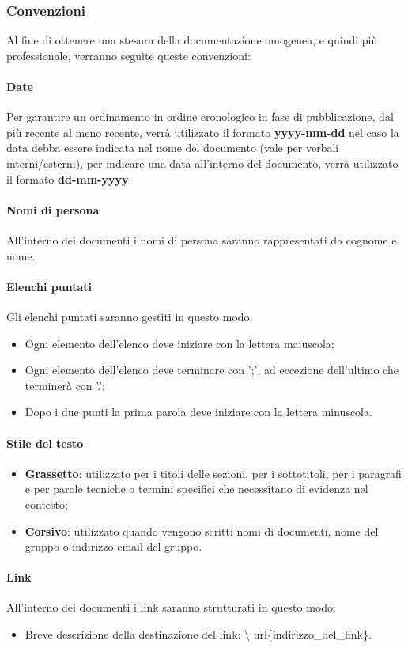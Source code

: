 \subsubsection{Convenzioni}
Al fine di ottenere una stesura della documentazione omogenea, e quindi più
professionale, verranno seguite queste convenzioni:
\paragraph{Date}
Per garantire un ordinamento in ordine cronologico in fase di pubblicazione,
dal più recente al meno recente, verrà utilizzato il formato
\textbf{yyyy-mm-dd} nel caso la data debba essere indicata nel nome del
documento (vale per verbali interni/esterni), per indicare una data all'interno
del documento, verrà utilizzato il formato \textbf{dd-mm-yyyy}.
\paragraph{Nomi di persona}
All'interno dei documenti i nomi di persona saranno rappresentati da cognome e
nome.
\paragraph{Elenchi puntati}
Gli elenchi puntati saranno gestiti in questo modo:
\begin{itemize}
    \item Ogni elemento dell'elenco deve iniziare con la lettera maiuscola;
    \item Ogni elemento dell'elenco deve terminare con ';', ad eccezione dell'ultimo che
          terminerà con '.';
    \item Dopo i due punti la prima parola deve iniziare con la lettera minuscola.
\end{itemize}
\paragraph{Stile del testo}
\begin{itemize}
    \item \textbf{Grassetto}: utilizzato per i titoli delle sezioni, per i sottotitoli, per i paragrafi e per parole tecniche o termini specifici che necessitano di evidenza nel contesto;
    \item \textbf{Corsivo}: utilizzato quando vengono scritti nomi di documenti, nome del gruppo o indirizzo email del gruppo.
\end{itemize}
\paragraph{Link}
All'interno dei documenti i link saranno strutturati in questo modo:
\begin{itemize}
    \item Breve descrizione della destinazione del link: \textbackslash
          url\{indirizzo\_del\_link\}.
\end{itemize}
